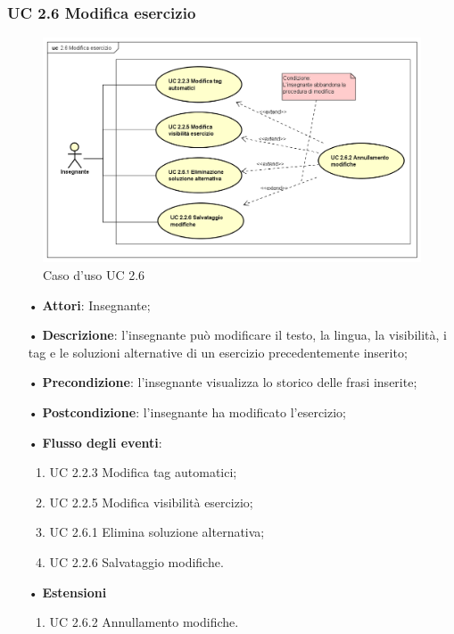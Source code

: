 \subsubsection{UC 2.6 Modifica esercizio}
\begin{figure}[H]
\centering
\includegraphics[width=17cm]{img/UC26.png} 
\caption{Caso d'uso UC 2.6}
\end{figure}

\begin{itemize}
	\item[•] \textbf{Attori}: Insegnante;
	\item[•] \textbf{Descrizione}: l’insegnante può modificare il testo, la lingua, la visibilità, i tag e le soluzioni alternative di un esercizio precedentemente inserito;
	\item[•] \textbf{Precondizione}: l'insegnante visualizza lo storico delle frasi inserite;
	\item[•] \textbf{Postcondizione}: l’insegnante ha modificato l'esercizio;
	\item[•] \textbf{Flusso degli eventi}:
		\begin{enumerate}
			\item UC 2.2.3 Modifica tag automatici;
			\item UC 2.2.5 Modifica visibilità esercizio;
			\item UC 2.6.1 Elimina soluzione alternativa;
			\item UC 2.2.6 Salvataggio modifiche.
		\end{enumerate}
	\item[•] \textbf{Estensioni}
	\begin{enumerate}
		\item UC 2.6.2 Annullamento modifiche.
	\end{enumerate}
\end{itemize}   

